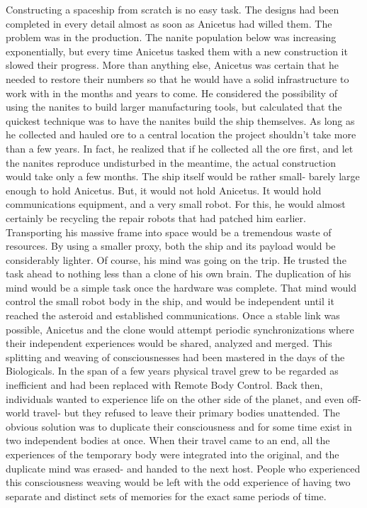 \documentclass[a4paper]{article}
\begin{document}
Constructing a spaceship from scratch is no easy task. The designs had been completed in every detail almost as soon as Anicetus had willed them. The problem was in the production.
The nanite population below was increasing exponentially, but every time Anicetus tasked them with a new construction it slowed their progress. More than anything else, Anicetus was certain that he needed to restore their numbers so that he would have a solid infrastructure to work with in the months and years to come. He considered the possibility of using the nanites to build larger manufacturing tools, but calculated that the quickest technique was to have the nanites build the ship themselves. As long as he collected and hauled ore to a central location the project shouldn’t take more than a few years. In fact, he realized that if he collected all the ore first, and let the nanites reproduce undisturbed in the meantime, the actual construction would take only a few months.
The ship itself would be rather small- barely large enough to hold Anicetus. But, it would not hold Anicetus. It would hold communications equipment, and a very small robot. For this, he would almost certainly be recycling the repair robots that had patched him earlier.
Transporting his massive frame into space would be a tremendous waste of resources. By using a smaller proxy, both the ship and its payload would be considerably lighter. Of course, his mind was going on the trip. He trusted the task ahead to nothing less than a clone of his own brain.
The duplication of his mind would be a simple task once the hardware was complete. That mind would control the small robot body in the ship, and would be independent until it reached the asteroid and established communications. Once a stable link was possible, Anicetus and the clone would attempt periodic synchronizations where their independent experiences would be shared, analyzed and merged. This splitting and weaving of consciousnesses had been mastered in the days of the Biologicals. In the span of a few years physical travel grew to be regarded as inefficient and had been replaced with Remote Body Control.
Back then, individuals wanted to experience life on the other side of the planet, and even off-world travel- but they refused to leave their primary bodies unattended. The obvious solution was to duplicate their consciousness and for some time exist in two independent bodies at once. When their travel came to an end, all the experiences of the temporary body were integrated into the original, and the duplicate mind was erased- and handed to the next host. People who experienced this consciousness weaving would be left with the odd experience of having two separate and distinct sets of memories for the exact same periods of time.
\end{document}
